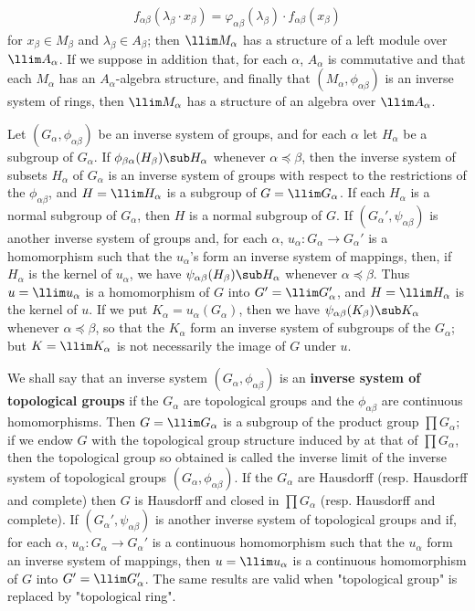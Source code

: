 \begin{align}\label{inverse limit ring and module}
f_{\alpha\beta}(\lambda_\beta\cdot x_\beta)=\varphi_{\alpha\beta}(\lambda_\beta)\cdot f_{\alpha\beta}(x_\beta)
\end{align}
for $x_\beta\in M_\beta$ and $\lambda_\beta\in A_\beta$; then $\llim M_\alpha$ has a structure of a left module over $\llim A_\alpha$. If we suppose in addition that, for each $\alpha$, $A_\alpha$ is commutative and that each $M_\alpha$ has an $A_\alpha$-algebra structure, and finally that $(M_\alpha,\phi_{\alpha\beta})$ is an inverse system of rings, then $\llim M_\alpha$ has a structure of an algebra over $\llim A_\alpha$.\par
Let $(G_\alpha,\phi_{\alpha\beta})$ be an inverse system of groups, and for each $\alpha$ let $H_\alpha$ be a subgroup of $G_\alpha$. If $\phi_{\beta\alpha}(H_\beta)\sub H_\alpha$ whenever $\alpha\preceq\beta$, then the inverse system of subsets $H_\alpha$ of $G_\alpha$ is an inverse system of groups with respect to the restrictions of the $\phi_{\alpha\beta}$, and $H=\llim H_\alpha$ is a subgroup of $G=\llim G_\alpha$. If each $H_\alpha$ is a normal subgroup of $G_\alpha$, then $H$ is a normal subgroup of $G$. If $(G_\alpha',\psi_{\alpha\beta})$ is another inverse system of groups and, for each $\alpha$, $u_\alpha:G_\alpha\to G_\alpha'$ is a homomorphism such that the $u_\alpha$'s form an inverse system of mappings, then, if $H_\alpha$ is the kernel of $u_\alpha$, we have $\psi_{\alpha\beta}(H_\beta)\sub H_\alpha$ whenever $\alpha\preceq\beta$. Thus $u=\llim u_\alpha$ is a homomorphism of $G$ into $G'=\llim G_\alpha'$, and $H=\llim H_\alpha$ is the kernel of $u$. If we put $K_\alpha=u_\alpha(G_\alpha)$, then we have $\psi_{\alpha\beta}(K_\beta)\sub K_\alpha$ whenever $\alpha\preceq\beta$, so that the $K_\alpha$ form an inverse system of subgroups of the $G_\alpha$; but $K=\llim K_\alpha$ is not necessarily the image of $G$ under $u$.\par
We shall say that an inverse system $(G_\alpha,\phi_{\alpha\beta})$ is an \textbf{inverse system of topological groups} if the $G_\alpha$ are topological groups and the $\phi_{\alpha\beta}$ are continuous homomorphisms. Then $G=\llim G_\alpha$ is a subgroup of the product group $\prod G_\alpha$; if we endow $G$ with the topological group structure induced by at that of $\prod G_\alpha$, then the topological group so obtained is called the inverse limit of the inverse system of topological groups $(G_\alpha,\phi_{\alpha\beta})$. If the $G_\alpha$ are Hausdorff (resp. Hausdorff and complete) then $G$ is Hausdorff and closed in $\prod G_\alpha$ (resp. Hausdorff and complete). If $(G_\alpha',\psi_{\alpha\beta})$ is another inverse system of topological groups and if, for each $\alpha$, $u_\alpha:G_\alpha\to G_\alpha'$ is a continuous homomorphism such that the $u_\alpha$ form an inverse system of mappings, then $u=\llim u_\alpha$ is a continuous homomorphism of $G$ into $G'=\llim G_\alpha'$. The same results are valid when "topological group" is replaced by "topological ring".\par

